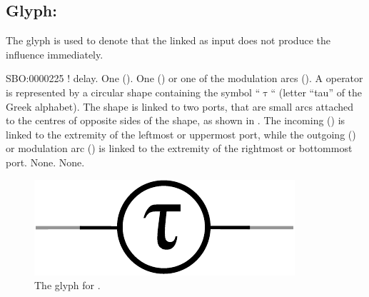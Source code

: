 
\subsection{Glyph: }\label{sec:delay}

The glyph  is used to denote that the  linked as input does not produce the influence immediately.

\begin{glyphDescription}
 \glyphSboTerm SBO:0000225 ! delay.
 \glyphIncoming One  ().
 \glyphOutgoing  One  () or one of the modulation arcs ().
 \glyphContainer A  operator is represented by a circular shape containing the symbol ``$\uptau$`` (letter ``tau'' of the Greek alphabet).
The shape is linked to two ports, that are small arcs attached to the centres of opposite sides of the shape, as shown in .
The incoming  () is linked to the extremity of the leftmost or uppermost port, while the outgoing  () or modulation arc () is linked to the extremity of the rightmost or bottommost port.
 \glyphLabel None.
 \glyphAux None.
\end{glyphDescription}

\begin{figure}[H]
  \centering
  \includegraphics[scale = 0.6]{images/build/delay.pdf}
  \caption{The \AF glyph for .}
  \label{fig:af:delay}
\end{figure}
\normalcolor
